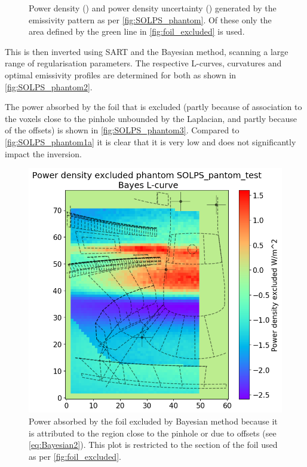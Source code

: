 \begin{figure}[!ht]
\begin{subfigure}{0.45\linewidth}
         \caption{}
         \label{fig:SOLPS_phantom1b}
     \end{subfigure}
    \caption{Power density () and power density uncertainty () generated by the emissivity pattern as per \autoref{fig:SOLPS_phantom}. Of these only the area defined by the green line in \autoref{fig:foil_excluded} is used.}
    \label{fig:SOLPS_phantom1}
\end{figure}

This is then inverted using SART and the Bayesian method, scanning a large range of regularisation parameters. The respective L-curves, curvatures and optimal emissivity profiles are determined for both as shown in \autoref{fig:SOLPS_phantom2}.

The power absorbed by the foil that is excluded (partly because of association to the voxels close to the pinhole unbounded by the Laplacian, and partly because of the offsets) is shown in \autoref{fig:SOLPS_phantom3}. Compared to \autoref{fig:SOLPS_phantom1a} it is clear that it is very low and does not significantly impact the inversion.

\begin{figure}[!ht]
	\centering
	\includegraphics[trim={0 0 0 45},clip,width=0.5\linewidth]{Chapters/chapter2/figs/inversion_comparison_foil_power_excluded_SOLPS_pantom_test-Bayes.png}
	\caption{Power absorbed by the foil excluded by Bayesian method because it is attributed to the region close to the pinhole or due to offsets (see \autoref{eq:Bayesian2}). This plot is restricted to the section of the foil used as per \autoref{fig:foil_excluded}.}
	\label{fig:SOLPS_phantom3}
\end{figure}

